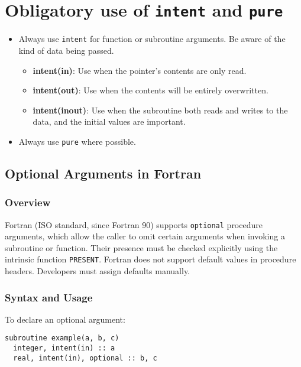 \documentclass{article}
\begin{document}
\section{Obligatory use of \texttt{intent} and \texttt{pure} }
\begin{itemize}
  \item Always use \texttt{intent} for function or subroutine arguments.
    Be aware of the kind of data being passed.

  \begin{itemize}
    \item \textbf{intent(in)}: Use when the pointer's contents are only read.
    \item \textbf{intent(out)}: Use when the contents will be entirely overwritten.
    \item \textbf{intent(inout)}: Use when the subroutine both reads and writes to the data, and the initial values are important.
  \end{itemize}
  \item Always use \texttt{pure} where possible.
\end{itemize}


\subsection{Optional Arguments in Fortran}

\subsubsection{Overview}

Fortran (ISO standard, since Fortran 90) supports \texttt{optional} procedure arguments, which allow the caller to omit certain arguments when invoking a subroutine or function. Their presence must be checked explicitly using the intrinsic function \texttt{PRESENT}. Fortran does not support default values in procedure headers. Developers must assign defaults manually.

\subsubsection{Syntax and Usage}

To declare an optional argument:

\begin{verbatim}
subroutine example(a, b, c)
  integer, intent(in) :: a
  real, intent(in), optional :: b, c
\end{verbatim}
\end{document}
